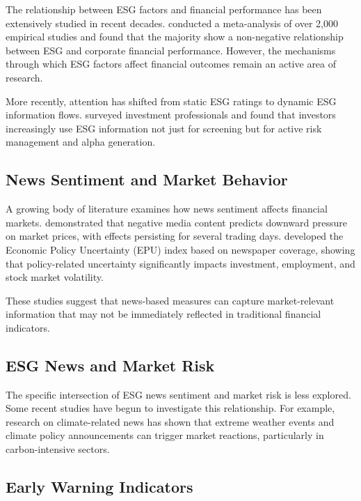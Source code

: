 \documentclass[12pt,a4paper]{article}
\begin{document}
The relationship between ESG factors and financial performance has been extensively studied in recent decades. \citet{friede2015esg} conducted a meta-analysis of over 2,000 empirical studies and found that the majority show a non-negative relationship between ESG and corporate financial performance. However, the mechanisms through which ESG factors affect financial outcomes remain an active area of research.

More recently, attention has shifted from static ESG ratings to dynamic ESG information flows. \citet{amel2018esg} surveyed investment professionals and found that investors increasingly use ESG information not just for screening but for active risk management and alpha generation.

\subsection{News Sentiment and Market Behavior}
\label{subsec:lit-sentiment}

A growing body of literature examines how news sentiment affects financial markets. \citet{tetlock2007giving} demonstrated that negative media content predicts downward pressure on market prices, with effects persisting for several trading days. \citet{baker2016measuring} developed the Economic Policy Uncertainty (EPU) index based on newspaper coverage, showing that policy-related uncertainty significantly impacts investment, employment, and stock market volatility.

These studies suggest that news-based measures can capture market-relevant information that may not be immediately reflected in traditional financial indicators.

\subsection{ESG News and Market Risk}
\label{subsec:lit-esg-risk}

The specific intersection of ESG news sentiment and market risk is less explored. Some recent studies have begun to investigate this relationship. For example, research on climate-related news has shown that extreme weather events and climate policy announcements can trigger market reactions, particularly in carbon-intensive sectors.

\subsection{Early Warning Indicators}
\label{subsec:lit-early-warning}
\end{document}
